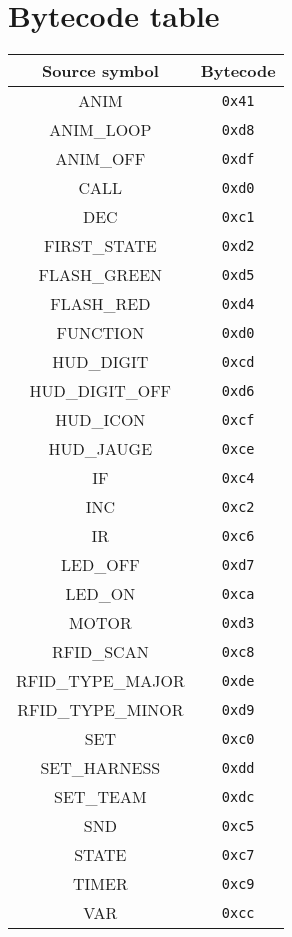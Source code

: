 \documentclass[12pt,a4paper]{scrbook}
\begin{document}
\section{Bytecode table}
\begin{center}
  \begin{tabular}{| c | c | }
    \hline
    Source symbol & Bytecode \\ \hline \hline
    ANIM 			& \texttt{0x41}  \\ \hline
    ANIM\_LOOP 		& \texttt{0xd8}  \\ \hline
    ANIM\_OFF 		& \texttt{0xdf}  \\ \hline
    CALL 			& \texttt{0xd0}  \\ \hline
    DEC 			& \texttt{0xc1}  \\ \hline
    FIRST\_STATE 	& \texttt{0xd2}  \\ \hline
    FLASH\_GREEN 	& \texttt{0xd5}  \\ \hline
   	FLASH\_RED 		& \texttt{0xd4}  \\ \hline
    FUNCTION 		& \texttt{0xd0}  \\ \hline
    HUD\_DIGIT 		& \texttt{0xcd}  \\ \hline
    HUD\_DIGIT\_OFF 	& \texttt{0xd6}  \\ \hline
    HUD\_ICON 		& \texttt{0xcf}  \\ \hline
    HUD\_JAUGE 		& \texttt{0xce}  \\ \hline
    IF 				& \texttt{0xc4}  \\ \hline
    INC 			& \texttt{0xc2}  \\ \hline
    IR 				& \texttt{0xc6}  \\ \hline
    LED\_OFF 		& \texttt{0xd7}  \\ \hline
    LED\_ON 			& \texttt{0xca}  \\ \hline
    MOTOR 			& \texttt{0xd3}  \\ \hline
    RFID\_SCAN 		& \texttt{0xc8}  \\ \hline
    RFID\_TYPE\_MAJOR & \texttt{0xde}  \\ \hline
    RFID\_TYPE\_MINOR & \texttt{0xd9}  \\ \hline
    SET 			& \texttt{0xc0}  \\ \hline
    SET\_HARNESS 	& \texttt{0xdd}  \\ \hline
    SET\_TEAM 		& \texttt{0xdc}  \\ \hline
    SND 			& \texttt{0xc5}  \\ \hline
    STATE 			& \texttt{0xc7}  \\ \hline
    TIMER		 	& \texttt{0xc9}  \\ \hline
    VAR 			& \texttt{0xcc}  \\ \hline
  \end{tabular}
\end{center}
\end{document}
